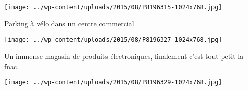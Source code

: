  \newline
\centerline{\texttt{[image: ../wp-content/uploads/2015/08/P8196315-1024x768.jpg]} } 
 \newline
 Parking à vélo dans un centre commercial \newline
 \newline
\centerline{\texttt{[image: ../wp-content/uploads/2015/08/P8196327-1024x768.jpg]} } 
 \newline
 Un immense magasin de produits électroniques, finalement c'est tout petit la fnac. \newline
 \newline
\centerline{\texttt{[image: ../wp-content/uploads/2015/08/P8196329-1024x768.jpg]} } 
 \newline

\newpage
 
